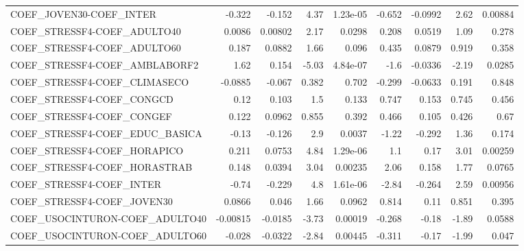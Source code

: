 \begin{tabular}{lrrrrrrrr}
COEF\_JOVEN30-COEF\_INTER               &      -0.322 &       -0.152 &     4.37 & 1.23e-05 &     -0.652 &     -0.0992 &         2.62 &       0.00884 \\
COEF\_STRESSF4-COEF\_ADULTO40           &      0.0086 &      0.00802 &     2.17 &   0.0298 &      0.208 &      0.0519 &         1.09 &         0.278 \\
COEF\_STRESSF4-COEF\_ADULTO60           &       0.187 &       0.0882 &     1.66 &    0.096 &      0.435 &      0.0879 &        0.919 &         0.358 \\
COEF\_STRESSF4-COEF\_AMBLABORF2         &        1.62 &        0.154 &    -5.03 & 4.84e-07 &       -1.6 &     -0.0336 &        -2.19 &        0.0285 \\
COEF\_STRESSF4-COEF\_CLIMASECO          &     -0.0885 &       -0.067 &    0.382 &    0.702 &     -0.299 &     -0.0633 &        0.191 &         0.848 \\
COEF\_STRESSF4-COEF\_CONGCD             &        0.12 &        0.103 &      1.5 &    0.133 &      0.747 &       0.153 &        0.745 &         0.456 \\
COEF\_STRESSF4-COEF\_CONGEF             &       0.122 &       0.0962 &    0.855 &    0.392 &      0.466 &       0.105 &        0.426 &          0.67 \\
COEF\_STRESSF4-COEF\_EDUC\_BASICA        &       -0.13 &       -0.126 &      2.9 &   0.0037 &      -1.22 &      -0.292 &         1.36 &         0.174 \\
COEF\_STRESSF4-COEF\_HORAPICO           &       0.211 &       0.0753 &     4.84 & 1.29e-06 &        1.1 &        0.17 &         3.01 &       0.00259 \\
COEF\_STRESSF4-COEF\_HORASTRAB          &       0.148 &       0.0394 &     3.04 &  0.00235 &       2.06 &       0.158 &         1.77 &        0.0765 \\
COEF\_STRESSF4-COEF\_INTER              &       -0.74 &       -0.229 &      4.8 & 1.61e-06 &      -2.84 &      -0.264 &         2.59 &       0.00956 \\
COEF\_STRESSF4-COEF\_JOVEN30            &      0.0866 &        0.046 &     1.66 &   0.0962 &      0.814 &        0.11 &        0.851 &         0.395 \\
COEF\_USOCINTURON-COEF\_ADULTO40        &    -0.00815 &      -0.0185 &    -3.73 &  0.00019 &     -0.268 &       -0.18 &        -1.89 &        0.0588 \\
COEF\_USOCINTURON-COEF\_ADULTO60        &      -0.028 &      -0.0322 &    -2.84 &  0.00445 &     -0.311 &       -0.17 &        -1.99 &         0.047 \\

\end{tabular}
